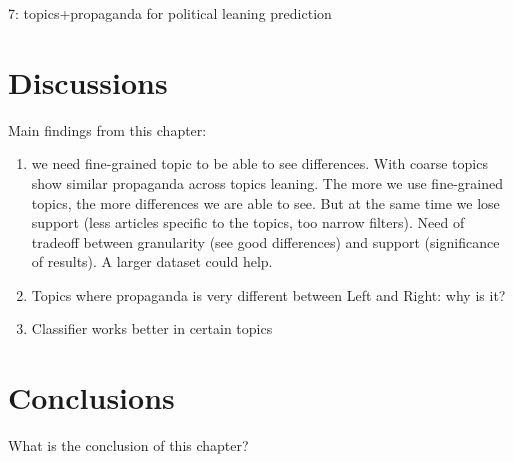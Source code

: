 7: topics+propaganda for political leaning prediction

\section{\statusred Discussions}
\label{sec:topic_discussion}

Main findings from this chapter:

\begin{enumerate}
    \item we need fine-grained topic to be able to see differences. With coarse topics show similar propaganda across topics leaning. The more we use fine-grained topics, the more differences we are able to see. But at the same time we lose support (less articles specific to the topics, too narrow filters). Need of tradeoff between granularity (see good differences) and support (significance of results). A larger dataset could help.
    \item Topics where propaganda is very different between Left and Right: why is it?
    \item Classifier works better in certain topics
\end{enumerate}


\section{Conclusions}
\label{sec:topic_conclusion}

What is the conclusion of this chapter?
